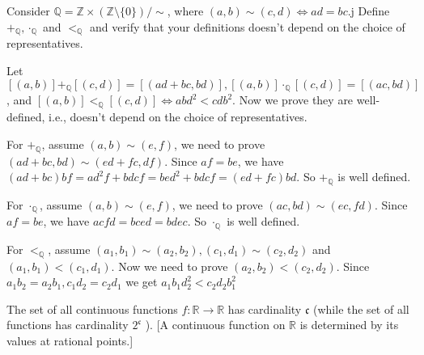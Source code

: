 \documentclass{ctexart}
\newif\ifpreface
\begin{document}
\large
\setlength{\baselineskip}{1.2em}
\ifpreface
	
\else
	\maketitle
\fi
{}
\begin{problem}
Consider \(\mathbb{Q}=\mathbb{Z} \times (\mathbb{Z} \setminus \{0\})/\sim\), where \((a,b)\sim(c,d) \iff ad=bc\).j
Define \(+_\mathbb{Q},\cdot_\mathbb{Q}\) and \(<_\mathbb{Q}\) and verify that your definitions
doesn't depend on the choice of representatives.
\end{problem}
\begin{solution}
	Let \([(a,b)]+_\mathbb{Q}[(c,d)]=[(ad+bc,bd)],[(a,b)]\cdot_\mathbb{Q}[(c,d)]=[(ac,bd)]\),
	and \([(a,b)]<_\mathbb{Q} [(c,d)]\iff a b d^2<c d b^2\).
	Now we prove they are well-defined, i.e., doesn't depend on the choice of representatives.

	For \(+_\mathbb{Q}\), assume \((a,b)\sim (e,f)\), we need to prove
	\((ad+bc,bd)\sim (ed+fc,df)\).
	Since \(af=be\), we have \((ad+bc)bf=ad^2f+bdcf=bed^2+bdcf=(ed+fc)bd\).
	So \(+_\mathbb{Q}\) is well defined.

	For \(\cdot_\mathbb{Q}\), assume \((a,b)\sim (e,f)\), we need to prove
	\((ac,bd)\sim (ec,fd)\).
	Since \(af=be\), we have \(acfd=bced=bdec\).
	So \(\cdot_\mathbb{Q}\) is well defined.

	For \(<_\mathbb{Q}\), assume \((a_1,b_1)\sim (a_2,b_2),(c_1,d_1)\sim(c_2,d_2)\) and \((a_1,b_1)<(c_1,d_1)\).
	Now we need to prove \((a_2,b_2)<(c_2,d_2)\).
	Since \(a_1b_2=a_2b_1,c_1d_2=c_2d_1\) we get
	\(a_1 b_1 d_2^2<c_2 d_2 b_1^2\)
\end{solution}

\begin{problem}
The set of all continuous functions $f: \mathbb{R} \rightarrow \mathbb{R}$ has cardinality $\mathfrak{c}$ (while the set of all functions has cardinality $2^{\mathfrak{c}}$ ).
[A continuous function on $\mathbb{R}$ is determined by its values at rational points.]
\end{problem}
\end{document}
